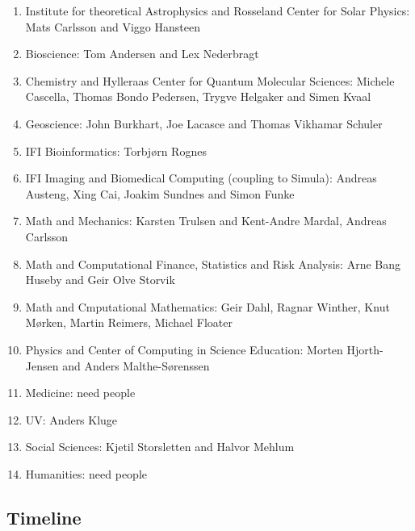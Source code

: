 \documentclass[%
oneside,                 %
final,                   %
10pt]{article}
\begin{document}
\begin{enumerate}
\item Institute for theoretical Astrophysics and Rosseland Center for Solar Physics: Mats Carlsson and Viggo Hansteen

\item Bioscience: Tom Andersen and Lex Nederbragt

\item Chemistry and Hylleraas Center for Quantum Molecular Sciences: Michele Cascella, Thomas Bondo Pedersen, Trygve Helgaker and Simen Kvaal

\item Geoscience: John Burkhart, Joe Lacasce and Thomas Vikhamar Schuler

\item IFI Bioinformatics: Torbjørn Rognes

\item IFI Imaging and Biomedical Computing (coupling to Simula): Andreas Austeng, Xing Cai, Joakim Sundnes and Simon Funke

\item Math and Mechanics: Karsten Trulsen and Kent-Andre Mardal, Andreas Carlsson

\item Math and Computational Finance, Statistics and Risk Analysis: Arne Bang Huseby and Geir Olve Storvik

\item Math and Cmputational Mathematics: Geir Dahl, Ragnar Winther, Knut Mørken, Martin Reimers, Michael Floater

\item Physics and Center of Computing in Science Education: Morten Hjorth-Jensen and  Anders Malthe-Sørenssen

\item Medicine: need people

\item UV: Anders Kluge

\item Social Sciences: Kjetil Storsletten and Halvor Mehlum

\item Humanities: need people
\end{enumerate}

\noindent
\subsection*{Timeline}
\end{document}
